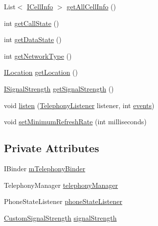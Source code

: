 \begin{DoxyCompactItemize}
\item 
List$<$ \hyperlink{interfacecom_1_1qualoutdoor_1_1recorder_1_1telephony_1_1ICellInfo}{I\-Cell\-Info} $>$ \hyperlink{classcom_1_1qualoutdoor_1_1recorder_1_1telephony_1_1TelephonyService_a7b9d95b5f6c9b8eb9e970f6c7f254677}{get\-All\-Cell\-Info} ()
\item 
int \hyperlink{classcom_1_1qualoutdoor_1_1recorder_1_1telephony_1_1TelephonyService_ab4452ab5791e52a2a00e7d2ee7626efd}{get\-Call\-State} ()
\item 
int \hyperlink{classcom_1_1qualoutdoor_1_1recorder_1_1telephony_1_1TelephonyService_ab75e2767c592cb1c48ccefcbe075ed1b}{get\-Data\-State} ()
\item 
int \hyperlink{classcom_1_1qualoutdoor_1_1recorder_1_1telephony_1_1TelephonyService_ab5c56c3345271c1146d0d4da90914b01}{get\-Network\-Type} ()
\item 
\hyperlink{interfacecom_1_1qualoutdoor_1_1recorder_1_1telephony_1_1ILocation}{I\-Location} \hyperlink{classcom_1_1qualoutdoor_1_1recorder_1_1telephony_1_1TelephonyService_af3e55e756592010491b87da8927e5cc9}{get\-Location} ()
\item 
\hyperlink{interfacecom_1_1qualoutdoor_1_1recorder_1_1telephony_1_1ISignalStrength}{I\-Signal\-Strength} \hyperlink{classcom_1_1qualoutdoor_1_1recorder_1_1telephony_1_1TelephonyService_a9360c2f3e55992b06c38d26cbf1768c0}{get\-Signal\-Strength} ()
\item 
void \hyperlink{classcom_1_1qualoutdoor_1_1recorder_1_1telephony_1_1TelephonyService_ae688a21a3298fab47e845c0b7ba8065e}{listen} (\hyperlink{classcom_1_1qualoutdoor_1_1recorder_1_1telephony_1_1TelephonyListener}{Telephony\-Listener} listener, int \hyperlink{classcom_1_1qualoutdoor_1_1recorder_1_1telephony_1_1TelephonyService_ab8b427dc82941cff7a38a14300f42f3c}{events})
\item 
void \hyperlink{classcom_1_1qualoutdoor_1_1recorder_1_1telephony_1_1TelephonyService_a8c2446484f717c321902b171161b3dbf}{set\-Minimum\-Refresh\-Rate} (int milliseconds)
\end{DoxyCompactItemize}
\subsection*{Private Attributes}
\begin{DoxyCompactItemize}
\item 
I\-Binder \hyperlink{classcom_1_1qualoutdoor_1_1recorder_1_1telephony_1_1TelephonyService_a1d7f4bd289769acd6c35b25a5ef31aed}{m\-Telephony\-Binder}
\item 
Telephony\-Manager \hyperlink{classcom_1_1qualoutdoor_1_1recorder_1_1telephony_1_1TelephonyService_a81a6850efcbcff0936ed580cb171ba3d}{telephony\-Manager}
\item 
Phone\-State\-Listener \hyperlink{classcom_1_1qualoutdoor_1_1recorder_1_1telephony_1_1TelephonyService_a506be3a4dee76693c315a0e377c506e5}{phone\-State\-Listener}
\item 
\hyperlink{classcom_1_1qualoutdoor_1_1recorder_1_1telephony_1_1CustomSignalStrength}{Custom\-Signal\-Strength} \hyperlink{classcom_1_1qualoutdoor_1_1recorder_1_1telephony_1_1TelephonyService_a52b73496a64d8a0b34d3635a76c5aadf}{signal\-Strength}
\end{DoxyCompactItemize}
